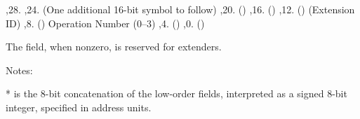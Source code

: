 \li \ins{},28. 
\li \ins{},24.  (One additional 16-bit symbol to follow)
\li \ins{},20. ()
\li \ins{},16. ()
\li \ins{},12. ()  (Extension ID)
\li \ins{},8. () Operation Number (0--3)
\li \ins{},4. ()
\li \ins{},0. ()

The  field, when nonzero, is reserved for extenders.

\bigskip
{
	\offinterlineskip
}
\bigskip

Notes:
\item{*}  is the 8-bit concatenation of the low-order fields,
interpreted as a signed 8-bit integer, specified in address units.

\maybye
